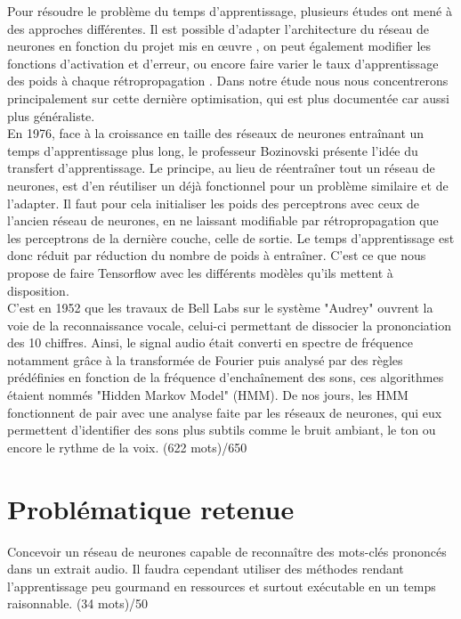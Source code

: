 \documentclass[12pt,a4paper, french]{article}
\begin{document}
Pour résoudre le problème du temps d’apprentissage, plusieurs études ont mené à des approches différentes. Il est possible d'adapter l'architecture du réseau de neurones en fonction du projet mis en \oe{}uvre \cite{typeNeuralNetworks}, on peut également modifier les fonctions d’activation et d’erreur, ou encore faire varier le taux d’apprentissage des poids à chaque rétropropagation \cite{gradientDescent}. Dans notre étude nous nous concentrerons principalement sur cette dernière optimisation, qui est plus documentée car aussi plus généraliste. \cite{bishop:2006:PRML} \medskip
\\
En 1976, face à la croissance en taille des réseaux de neurones entraînant un temps d’apprentissage plus long, le professeur Bozinovski présente l'idée du transfert d'apprentissage. \cite{bozinovski2020reminder} Le principe, au lieu de réentraîner tout un réseau de neurones, est d'en réutiliser un déjà fonctionnel pour un problème similaire et de l'adapter. Il faut pour cela initialiser les poids des perceptrons avec ceux de l'ancien réseau de neurones, en ne laissant modifiable par rétropropagation que les perceptrons de la dernière couche, celle de sortie. Le temps d'apprentissage est donc réduit par réduction du nombre de poids à entraîner. C'est ce que nous propose de faire Tensorflow avec les différents modèles qu'ils mettent à disposition. \cite{tf} \medskip
\\
C'est en 1952 que les travaux de Bell Labs sur  le système "Audrey" ouvrent la voie de la reconnaissance vocale, celui-ci permettant de dissocier la prononciation des 10 chiffres. Ainsi, le signal audio était converti en spectre de fréquence notamment grâce à la transformée de Fourier puis analysé par des règles prédéfinies en fonction de la fréquence d'enchaînement des sons, ces algorithmes étaient nommés "Hidden Markov Model" (HMM). \citep{juang1991hidden} De nos jours, les HMM fonctionnent de pair avec une analyse faite par les réseaux de neurones, qui eux permettent d'identifier des sons plus subtils comme le bruit ambiant, le ton ou encore le rythme de la voix. \citep{audioNN}
(622 mots)/650


\section*{Problématique retenue}
Concevoir un réseau de neurones capable de reconnaître des mots-clés prononcés dans un extrait audio. Il faudra cependant utiliser des méthodes rendant l'apprentissage peu gourmand en ressources et surtout exécutable en un temps raisonnable. 
(34 mots)/50
\end{document}
